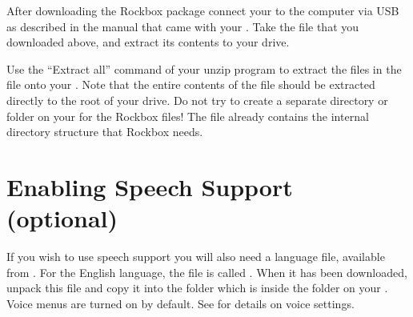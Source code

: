 After downloading the Rockbox package connect your \dap{} to the computer via
USB as described in the manual that came with your \dap{}. Take the file that
you downloaded above, and extract its contents to your \daps{} drive.


Use the ``Extract all'' command of your unzip program to extract the files in
the  file onto your \dap{}. Note that the entire contents of the
 file should be extracted directly to the root of your \daps{}
drive. Do not try to create a separate directory or folder on your \dap{} for
the Rockbox files! The  file already contains the internal
directory structure that Rockbox needs.



\section{Enabling Speech Support (optional)}\label{sec:enabling_speech_support}
If you wish to use speech support you will also need a language file, available
from . For the English language, the file is called
. When it has been downloaded, unpack this file and copy
it into the  folder which is inside the  folder on
your \dap{}. Voice menus are turned on by default. See
 for details on voice settings.

